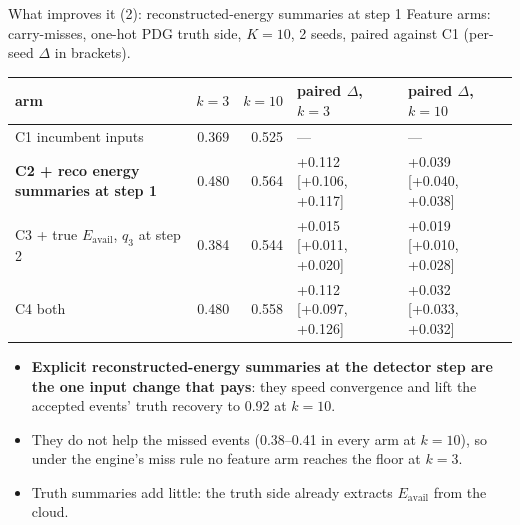 \documentclass[aspectratio=169,10pt]{beamer}
\def\evidencetext{}
\begin{document}
\gdef\evidencetext{\texttt{phase\_b/pet/results/summary.json}; \texttt{phase\_b/pet/results/b2e5-C\{1..4\}-H-s\{1,2\}.scores.json}}
\begin{frame}{What improves it (2): reconstructed-energy summaries at step 1}
{\small Feature arms: carry-misses, one-hot PDG truth side, $K=10$, 2 seeds, paired against C1
(per-seed $\Delta$ in brackets).}
\begin{center}
{\footnotesize
\begin{tabular}{lrrll}
\toprule
arm & $k=3$ & $k=10$ & paired $\Delta$, $k=3$ & paired $\Delta$, $k=10$ \\
\midrule
C1 incumbent inputs & 0.369 & 0.525 & --- & --- \\
\textbf{C2 + reco energy summaries at step 1} & 0.480 & 0.564 & +0.112 [+0.106, +0.117] & +0.039 [+0.040, +0.038] \\
C3 + true $E_{\mathrm{avail}}$, $q_3$ at step 2 & 0.384 & 0.544 & +0.015 [+0.011, +0.020] & +0.019 [+0.010, +0.028] \\
C4 both & 0.480 & 0.558 & +0.112 [+0.097, +0.126] & +0.032 [+0.033, +0.032] \\
\bottomrule
\end{tabular}}
\end{center}
\begin{itemize}\small
\item \textbf{Explicit reconstructed-energy summaries at the detector step are the one input change that pays}:
they speed convergence and lift the accepted events' truth recovery to 0.92 at $k=10$.
\item They do not help the missed events (0.38--0.41 in every arm at $k=10$), so
under the engine's miss rule no feature arm reaches the floor at $k=3$.
\item Truth summaries add little: the truth side already extracts $E_{\mathrm{avail}}$ from the cloud.
\end{itemize}
\end{frame}
\end{document}

